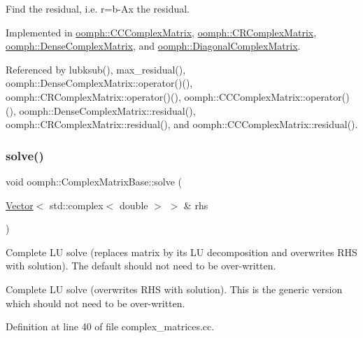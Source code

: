 Find the residual, i.\+e. r=b-\/\+Ax the residual. 



Implemented in \hyperlink{classoomph_1_1CCComplexMatrix_ade719948640907a8f338f83ee1587a90}{oomph\+::\+C\+C\+Complex\+Matrix}, \hyperlink{classoomph_1_1CRComplexMatrix_ae117c59a8e27c2e909338847044a2968}{oomph\+::\+C\+R\+Complex\+Matrix}, \hyperlink{classoomph_1_1DenseComplexMatrix_a76146afe81a055af475a107231468afb}{oomph\+::\+Dense\+Complex\+Matrix}, and \hyperlink{classoomph_1_1DiagonalComplexMatrix_a320b1114e1be99d82694793b30ce9251}{oomph\+::\+Diagonal\+Complex\+Matrix}.



Referenced by lubksub(), max\+\_\+residual(), oomph\+::\+Dense\+Complex\+Matrix\+::operator()(), oomph\+::\+C\+R\+Complex\+Matrix\+::operator()(), oomph\+::\+C\+C\+Complex\+Matrix\+::operator()(), oomph\+::\+Dense\+Complex\+Matrix\+::residual(), oomph\+::\+C\+R\+Complex\+Matrix\+::residual(), and oomph\+::\+C\+C\+Complex\+Matrix\+::residual().

\mbox{\label{classoomph_1_1ComplexMatrixBase_a131e601fd0e82e811b26a3c11a455d0e}} 
\subsubsection{\texorpdfstring{solve()}{solve()}\hspace{0.1cm}{\footnotesize\ttfamily [1/2]}}
{\footnotesize\ttfamily void oomph\+::\+Complex\+Matrix\+Base\+::solve (\begin{DoxyParamCaption}\item[{\hyperlink{classoomph_1_1Vector}{Vector}$<$ std\+::complex$<$ double $>$ $>$ \&}]{rhs }\end{DoxyParamCaption})\hspace{0.3cm}{\ttfamily [virtual]}}



Complete LU solve (replaces matrix by its LU decomposition and overwrites R\+HS with solution). The default should not need to be over-\/written. 

Complete LU solve (overwrites R\+HS with solution). This is the generic version which should not need to be over-\/written. 

Definition at line 40 of file complex\+\_\+matrices.\+cc.



